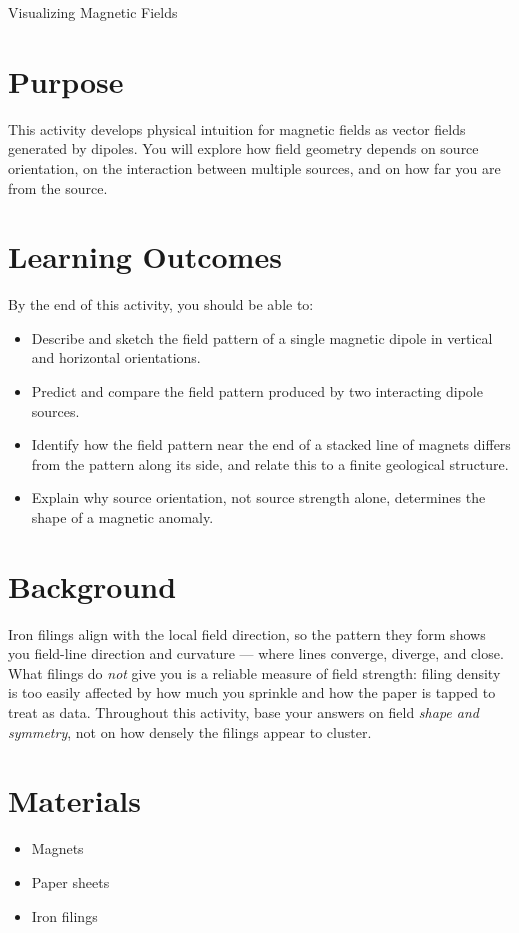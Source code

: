 \begin{activity}{Visualizing Magnetic Fields}

\section*{Purpose}

This activity develops physical intuition for magnetic fields as vector fields generated by dipoles. You will explore how field geometry depends on source orientation, on the interaction between multiple sources, and on how far you are from the source.

\section*{Learning Outcomes}

By the end of this activity, you should be able to:
\begin{itemize}
  \item Describe and sketch the field pattern of a single magnetic dipole in vertical and horizontal orientations.
  \item Predict and compare the field pattern produced by two interacting dipole sources.
  \item Identify how the field pattern near the end of a stacked line of magnets differs from the pattern along its side, and relate this to a finite geological structure.
  \item Explain why source orientation, not source strength alone, determines the shape of a magnetic anomaly.
\end{itemize}

\section*{Background}

Iron filings align with the local field direction, so the pattern they form shows you field-line direction and curvature --- where lines converge, diverge, and close. What filings do \emph{not} give you is a reliable measure of field strength: filing density is too easily affected by how much you sprinkle and how the paper is tapped to treat as data. Throughout this activity, base your answers on field \emph{shape and symmetry}, not on how densely the filings appear to cluster.

\section*{Materials}
\begin{itemize}
  \item Magnets
  \item Paper sheets
  \item Iron filings
\end{itemize}


\end{activity}
